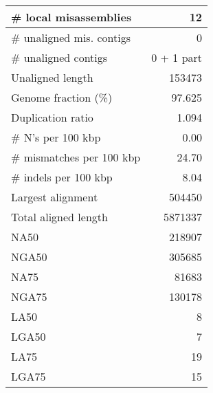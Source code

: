 \documentclass[12pt,a4paper]{article}
\begin{document}
\begin{table}[ht]
\begin{center}
\begin{tabular}{|l*{1}{|r}|}
\# local misassemblies & 12 \\ \hline
\# unaligned mis. contigs & 0 \\ \hline
\# unaligned contigs & 0 + 1 part \\ \hline
Unaligned length & 153473 \\ \hline
Genome fraction (\%) & 97.625 \\ \hline
Duplication ratio & 1.094 \\ \hline
\# N's per 100 kbp & 0.00 \\ \hline
\# mismatches per 100 kbp & 24.70 \\ \hline
\# indels per 100 kbp & 8.04 \\ \hline
Largest alignment & 504450 \\ \hline
Total aligned length & 5871337 \\ \hline
NA50 & 218907 \\ \hline
NGA50 & 305685 \\ \hline
NA75 & 81683 \\ \hline
NGA75 & 130178 \\ \hline
LA50 & 8 \\ \hline
LGA50 & 7 \\ \hline
LA75 & 19 \\ \hline
LGA75 & 15 \\ \hline
\end{tabular}
\end{center}
\end{table}
\end{document}
